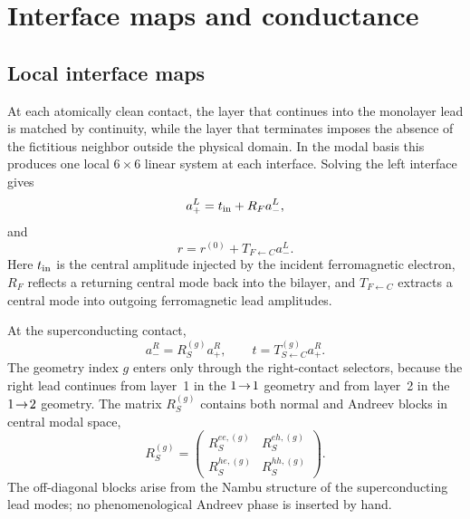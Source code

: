 \section{Interface maps and conductance}
\label{sec:conductance}

\subsection{Local interface maps}
\label{subsec:interface-maps}

At each atomically clean contact, the layer that continues into the monolayer lead is matched by continuity, while the layer that terminates imposes the absence of the fictitious neighbor outside the physical domain.  In the modal basis this produces one local $6\times6$ linear system at each interface.  Solving the left interface gives
\begin{equation}
    a_+^L=t_{\rm in}+R_F a_-^L,
    \label{eq:left-interface-map}
\end{equation}
and
\begin{equation}
    r=r^{(0)}+T_{F\leftarrow C}a_-^L.
    \label{eq:left-extraction-map}
\end{equation}
Here $t_{\rm in}$ is the central amplitude injected by the incident ferromagnetic electron, $R_F$ reflects a returning central mode back into the bilayer, and $T_{F\leftarrow C}$ extracts a central mode into outgoing ferromagnetic lead amplitudes.

At the superconducting contact,
\begin{equation}
    a_-^R=R_S^{(g)}a_+^R,
    \qquad
    t=T_{S\leftarrow C}^{(g)}a_+^R.
    \label{eq:right-interface-map}
\end{equation}
The geometry index $g$ enters only through the right-contact selectors, because the right lead continues from layer~1 in the $1\!\to\!1$ geometry and from layer~2 in the $1\!\to\!2$ geometry.  The matrix $R_S^{(g)}$ contains both normal and Andreev blocks in central modal space,
\begin{equation}
    R_S^{(g)}=
    \begin{pmatrix}
        R_{S}^{ee,(g)} & R_{S}^{eh,(g)}\\
        R_{S}^{he,(g)} & R_{S}^{hh,(g)}
    \end{pmatrix}.
    \label{eq:RS-blocks}
\end{equation}
The off-diagonal blocks arise from the Nambu structure of the superconducting lead modes; no phenomenological Andreev phase is inserted by hand.

